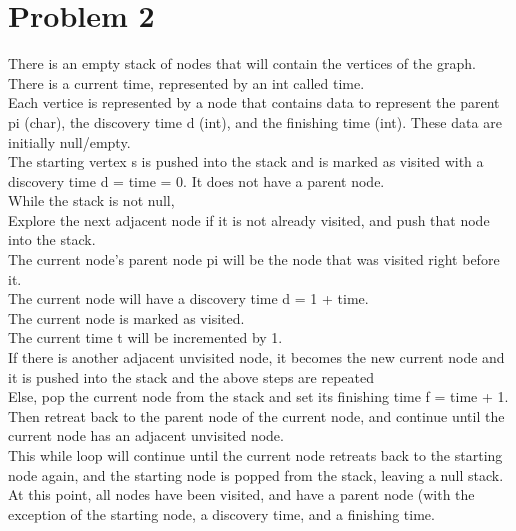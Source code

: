 \documentclass[14pt]{extarticle}
\begin{document}
\section*{Problem 2}
There is an empty stack of nodes that will contain the vertices of the graph.\\
There is a current time, represented by an int called time.\\
Each vertice is represented by a node that contains data to represent the parent pi (char), the discovery time d (int), and the finishing time (int). These data are initially null/empty.\\
The starting vertex s is pushed into the stack and is marked as visited with a discovery time d = time = 0. It does not have a parent node.\\
While the stack is not null,\\
Explore the next adjacent node if it is not already visited, and push that node into the stack. \\
The current node’s parent node pi will be the node that was visited right before it.\\
The current node will have a discovery time d = 1 + time.\\
The current node is marked as visited.\\
The current time t will be incremented by 1.\\
If there is another adjacent unvisited node, it becomes the new current node and it is pushed into the stack and the above steps are repeated\\
Else, pop the current node from the stack and set its finishing time f = time + 1. Then retreat back to the parent node of the current node, and continue until the current node has an adjacent unvisited node.\\
This while loop will continue until the current node retreats back to the starting node again, and the starting node is popped from the stack, leaving a null stack.\\
At this point, all nodes have been visited, and have a parent node (with the exception of the starting node, a discovery time, and a finishing time.\\
\end{document}
